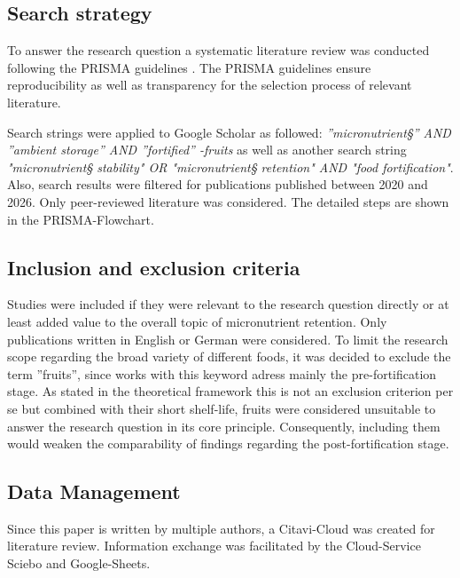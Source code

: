 \subsection{Search strategy}
To answer the research question a systematic literature review was conducted following the PRISMA guidelines \autocite{prisma}. The PRISMA guidelines ensure reproducibility as well as transparency for the selection process of relevant literature. \par 
Search strings were applied to Google Scholar as followed: \textit{''micronutrient§'' AND ''ambient storage'' AND ''fortified'' -fruits} as well as another search string \textit{"micronutrient§ stability" OR "micronutrient§ retention" AND "food fortification"}.
Also, search results were filtered for publications published between 2020 and 2026. Only peer-reviewed literature was considered. The detailed steps are shown in the PRISMA-Flowchart.



\subsection{Inclusion and exclusion criteria}
Studies were included if they were relevant to the research question directly or at least added value to the overall topic of micronutrient retention. Only publications written in English or German were considered. To limit the research scope regarding the broad variety of different foods, it was decided to exclude the term ''fruits'', since works with this keyword adress mainly the pre-fortification stage. As stated in the theoretical framework this is not an exclusion criterion per se but combined with their short shelf-life, fruits were considered unsuitable to answer the research question in its core principle. Consequently, including them would weaken the comparability of findings regarding the post-fortification stage.






\subsection{Data Management}
Since this paper is written by multiple authors, a Citavi-Cloud was created for literature review. Information exchange was facilitated by the Cloud-Service Sciebo and Google-Sheets.
